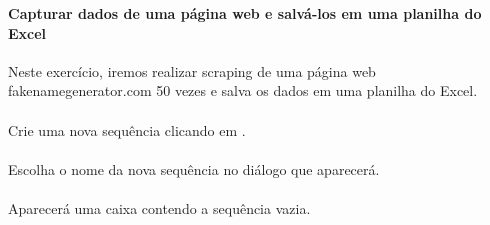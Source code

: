 \documentclass[letterpaper,10pt,brazil]{sphinxmanual}
\begin{document}
\subsubsection{}
\label{\detokenize{exercise_2:id1}}

\paragraph{Capturar dados de uma página web e salvá-los em uma planilha do Excel}
\label{\detokenize{exercise_2:capturar-dados-de-uma-pagina-web-e-salva-los-em-uma-planilha-do-excel}}
Neste exercício, iremos realizar scraping de uma página web \textendash{} fakenamegenerator.com \textendash{} 50 vezes e salva os dados em uma planilha do Excel.


\paragraph{}
\label{\detokenize{exercise_2:i-crie-uma-nova-sequencia}}
Crie uma nova sequência clicando em .

\begin{figure}[htbp]
\centering

\noindent{}
\end{figure}


\paragraph{}
\label{\detokenize{exercise_2:ii-escolha-o-nome-da-nova-sequencia}}
Escolha o nome da nova sequência no diálogo que aparecerá.

\begin{figure}[htbp]
\centering

\noindent{}
\end{figure}


\paragraph{}
\label{\detokenize{exercise_2:iii-sequencia-vazia}}
Aparecerá uma caixa contendo a sequência vazia.

\begin{figure}[htbp]
\centering

\noindent{}
\end{figure}
\end{document}
